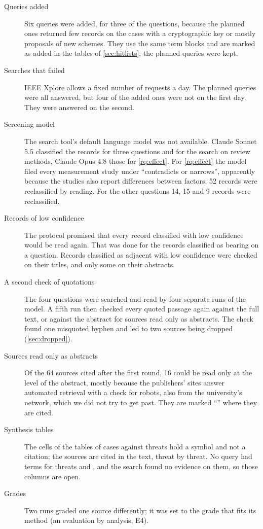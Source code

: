 \begin{description}
  \item[Queries added] Six queries were added, for three of the
    questions, because the planned ones returned few records on the cases
    with a cryptographic key or mostly proposals of new schemes.
    They use the same term blocks and are marked as added in the tables
    of \cref{sec:hitlists}; the planned queries were kept.
  \item[Searches that failed] IEEE Xplore allows a fixed number of
    requests a day.
    The planned queries were all answered, but four of the added ones
    were not on the first day.
    They were answered on the second.
  \item[Screening model] The search tool's default language model was
    not available.
    Claude Sonnet 5.5 classified the records for three questions and for
    the search on review methods, Claude Opus 4.8 those for
    \cref{rq:effect}.
    For \cref{rq:effect} the model filed every measurement study under
    \enquote{contradicts or narrows}, apparently because the studies also
    report differences between factors; 52 records were reclassified by
    reading.
    For the other questions 14, 15 and 9 records were reclassified.
  \item[Records of low confidence] The protocol promised that every
    record classified with low confidence would be read again.
    That was done for the records classified as bearing on a question.
    Records classified as adjacent with low confidence were checked on
    their titles, and only some on their abstracts.
  \item[A second check of quotations] The four questions were searched
    and read by four separate runs of the model.
    A fifth run then checked every quoted passage again against the full
    text, or against the abstract for sources read only as abstracts.
    The check found one misquoted hyphen and led to two sources being
    dropped (\cref{sec:dropped}).
  \item[Sources read only as abstracts] Of the 64 sources cited after
    the first round, 16 could
    be read only at the level of the abstract, mostly because the
    publishers' sites answer automated retrieval with a check for robots,
    also from the university's network, which we did not try to get
    past.
    They are marked \enquote{\abso} where they are cited.
  \item[Synthesis tables] The cells of the tables of cases against
    threats hold a symbol and not a citation; the sources are cited in
    the text, threat by threat.
    No query had terms for threats  and , and the
    search found no evidence on them, so those columns are open.
  \item[Grades] Two runs graded one source differently; it was set to
    the grade that fits its method (an evaluation by analysis, E4).
\end{description}

